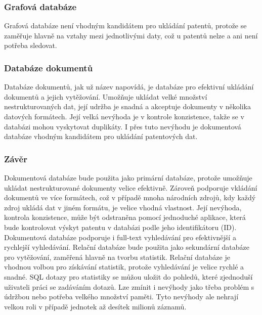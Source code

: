 \subsubsection{Grafová databáze}
Grafová databáze není vhodným kandidátem pro ukládání patentů, protože se zaměřuje hlavně na vztahy mezi jednotlivými daty, což u patentů nelze a ani není potřeba sledovat.

\subsubsection{Databáze dokumentů}
Databáze dokumentů, jak už název napovídá, je databáze pro efektivní ukládání dokumentů a jejich vytěžování. Umožňuje ukládat velké množství nestrukturovaných dat, její udržba je snadná a akceptuje dokumenty v několika datových formátech. Její velká nevýhoda je v kontrole konzistence, takže se v databázi mohou vyskytovat duplikáty. I přes tuto nevýhodu je dokumentová databáze vhodným kandidátem pro ukládání patentových dat.

\subsubsection{Závěr}
Dokumentová databáze bude použita jako primární databáze, protože umožňuje ukládat nestrukturované dokumenty velice efektivně. Zároveň podporuje vkládání dokumentů ve více formátech, což v případě mnoha národních zdrojů, kdy každý zdroj ukládá dat v jiném formátu, je velice vhodná vlastnost. Její nevýhoda, kontrola konzistence, může být odstraněna pomocí jednoduché aplikace, která bude kontrolovat výskyt patentu v databázi podle jeho identifikátoru (ID). Dokumentová databáze podporuje i full-text vyhledávání pro efektivnější a rychlejší vyhledávání.
\newline
\indent Relační databáze bude použita jako sekundární databáze pro vytěžování, zaměřená hlavně na tvorbu statistik. Relační databáze je vhodnou volbou pro získávání statistik, protože vyhledávání je velice rychlé a snadné. \gls{SQL} dotazy pro statistiky se můžou uložit do pohledů, které zjednoduší uživateli práci se zadáváním dotazů. Lze zmínit i nevýhody jako třeba problém s údržbou nebo potřeba velkého množství paměti. Tyto nevýhody ale nehrají velkou roli v případě jednotek až desítek milionů záznamů.

